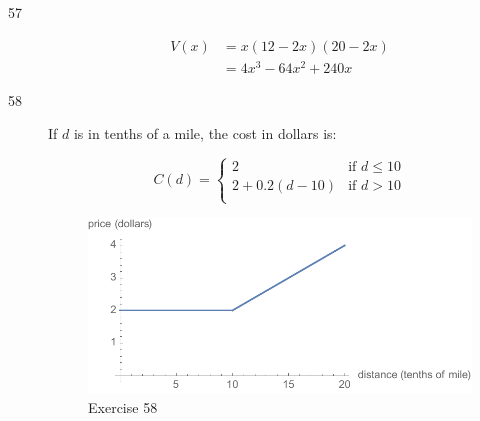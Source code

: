 \documentclass[letterpaper, landscape]{exam}
\begin{document}
\begin{description}



      \item[57]
        \begin{align*}
          V(x) & = x (12 - 2x) (20 - 2x) \\
               & = 4 x^3-64 x^2+240 x \end{align*}

      \item[58]
        If $d$ is in tenths of a mile, the cost in dollars is: 
        
        \[
          C(d) = 
            \begin{cases}
              2                & \text{if } d \leq 10 \\
              2 + 0.2 (d - 10) & \text{if } d > 10 \\
            \end{cases}
        \]

        \begin{figure}[H]
          \centering
          \includegraphics[scale = 0.8]{ex58.pdf}
          \caption{Exercise 58}
          \label{fig:ex58}
        \end{figure}


\end{description}
\end{document}
